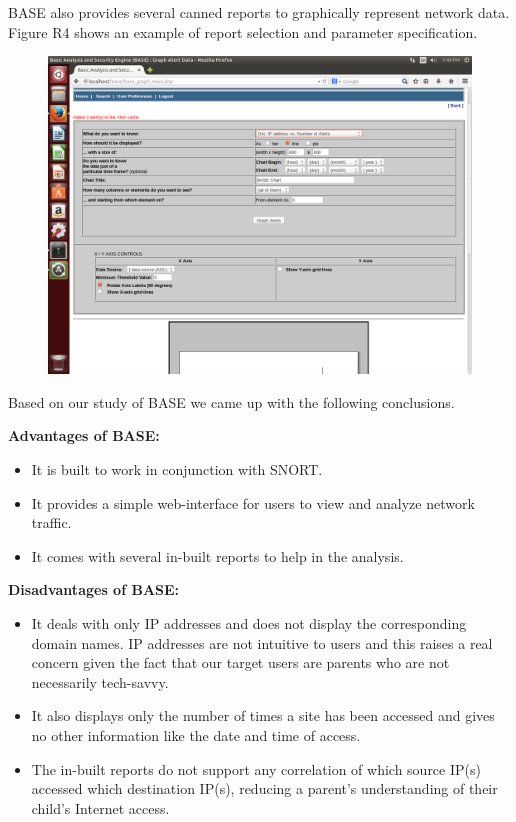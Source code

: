 BASE also provides several canned reports to graphically represent
network data. Figure R4 shows an example of report selection and
parameter specification.

\begin{figure}
\includegraphics{figures/R4_BASE_Report}
\end{figure}

Based on our study of BASE we came up with the following conclusions.

\textbf{Advantages of BASE:}
\begin{itemize}

\item It is built to work in conjunction with SNORT.

\item It provides a simple web-interface for users to view and
  analyze network traffic.

\item It comes with several in-built reports to help in the analysis.

\end{itemize}

\textbf{Disadvantages of BASE:}
\begin{itemize}

\item It deals with only IP addresses and does not display the
  corresponding domain names. 
  IP addresses are not intuitive to users and this raises a real
  concern given the fact that our target users are parents who are not
  necessarily tech-savvy.

\item It also displays only the number of times a site has been
  accessed and gives no other information like the date and time of
  access.

\item The in-built reports do not support any correlation of which
  source IP(s) accessed which destination IP(s), reducing a parent's
  understanding of their child's Internet access.

\end{itemize}

